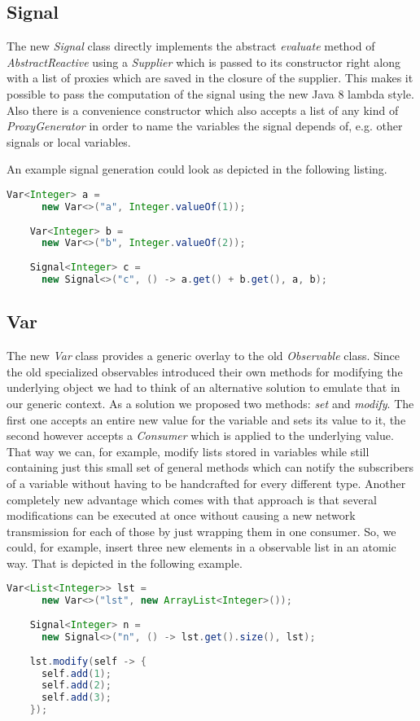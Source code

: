 \documentclass[11pt]{article}
\begin{document}
\subsection{Signal}
The new \emph{Signal} class directly implements the abstract \emph{evaluate} method of \emph{AbstractReactive} using a \emph{Supplier} which is passed to its constructor right along with a list of proxies which are saved in the closure of the supplier.
This makes it possible to pass the computation of the signal using the new Java 8 lambda style.
Also there is a convenience constructor which also accepts a list of any kind of \emph{ProxyGenerator} in order to name the variables the signal depends of, e.g. other signals or local variables.

An example signal generation could look as depicted in the following listing.
\begin{lstlisting}[language=java]
	Var<Integer> a =
	  new Var<>("a", Integer.valueOf(1));
	  
	Var<Integer> b =
	  new Var<>("b", Integer.valueOf(2));
	  
	Signal<Integer> c =
	  new Signal<>("c", () -> a.get() + b.get(), a, b);
\end{lstlisting}

\subsection{Var}
The new \emph{Var} class provides a generic overlay to the old \emph{Observable} class.
Since the old specialized observables introduced their own methods for modifying the underlying object we had to think of an alternative solution to emulate that in our generic context.
As a solution we proposed two methods: \emph{set} and \emph{modify}.
The first one accepts an entire new value for the variable and sets its value to it, the second however accepts a \emph{Consumer} which is applied to the underlying value.
That way we can, for example, modify lists stored in variables while still containing just this small set of general methods which can notify the subscribers of a variable without having to be handcrafted for every different type.
Another completely new advantage which comes with that approach is that several modifications can be executed at once without causing a new network transmission for each of those by just wrapping them in one consumer.
So, we could, for example, insert three new elements in a observable list in an atomic way.
That is depicted in the following example.
\begin{lstlisting}[language=java]
	Var<List<Integer>> lst =
	  new Var<>("lst", new ArrayList<Integer>());
	  
	Signal<Integer> n =
	  new Signal<>("n", () -> lst.get().size(), lst);
	  
	lst.modify(self -> {
	  self.add(1);
	  self.add(2);
	  self.add(3);
	});
\end{lstlisting}
\end{document}
